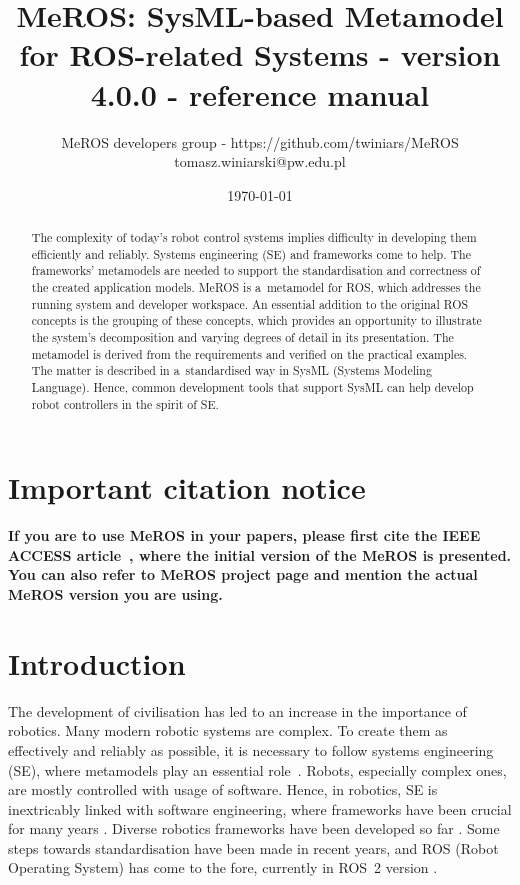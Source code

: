 \documentclass[11pt,oneside,a4paper]{report}
\begin{document}
	
\title{MeROS: SysML-based Metamodel for ROS-related Systems - version 4.0.0 - reference manual}
\author{MeROS developers group - https://github.com/twiniars/MeROS \\ tomasz.winiarski@pw.edu.pl}
\date{\today}

\maketitle


\begin{abstract}
	The complexity of today's robot control systems implies difficulty in developing them efficiently and reliably. Systems engineering (SE) and frameworks come to help. The frameworks' metamodels are needed to support the standardisation and correctness of the created application models. MeROS is a~metamodel for ROS, which addresses the running system and developer workspace. An essential addition to the original ROS concepts is the grouping of these concepts, which provides an opportunity to illustrate the system's decomposition and varying degrees of detail in its presentation. The metamodel is derived from the requirements and verified on the practical examples. The matter is described in a~standardised way in SysML (Systems Modeling Language). Hence, common development tools that support SysML can help develop robot controllers in the spirit of SE.
\end{abstract}
	
		
\chapter*{Important citation notice}

\textbf{If you are to use MeROS in your papers, please first cite the IEEE ACCESS  article~\cite{meros-access}, where the initial version of the MeROS is presented. You can also refer to MeROS project page \cite{meros-www} and mention the actual MeROS version you are using.}
	
	
\chapter{Introduction}
\label{ch:intro}	

	The development of civilisation has led to an increase in the importance of robotics. Many modern robotic systems are complex. To create them as effectively and reliably as possible, it is necessary to follow systems engineering (SE), where metamodels play an essential role~\cite{bezivin2004search,kent2002model,schmidt2006model}.
	Robots, especially complex ones, are mostly controlled with usage of software. Hence, in robotics, SE is inextricably linked with software engineering, where frameworks have been crucial for many years \cite{mnkandla2009software,shehory2014agent}.
	Diverse robotics frameworks have been developed so far \cite{hentout2016survey,inigo2012robotics,tsardoulias2017robotic}. Some steps towards standardisation have been made in recent years, and ROS (Robot Operating System) has come to the fore, currently in ROS~2 version \cite{maruyama2016exploring,park2020real}.   
	
\end{document}
